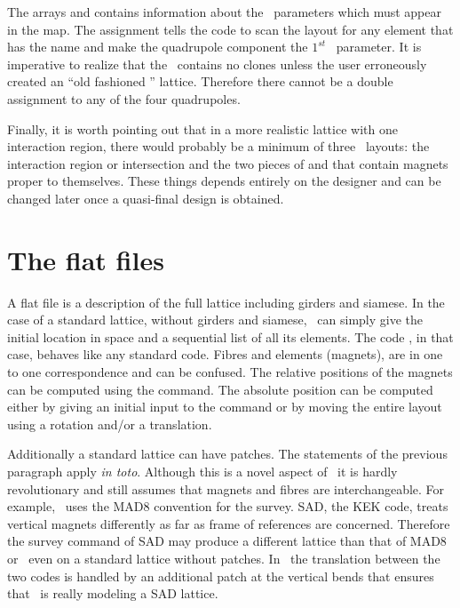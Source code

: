 The arrays  and  contains information about the \TPSA\ parameters which must appear in the map. The assignment  tells the code to scan the layout    for any element that has the name  and make the quadrupole component the $1^{st}$ \TPSA\ parameter. It is imperative to realize that the \DNA\ contains no clones unless the user erroneously created an ``old fashioned '' lattice. Therefore there cannot be a double assignment  to any of the four quadrupoles.

Finally, it is worth pointing out that in a more realistic lattice with one interaction region, there would probably be a minimum of three \DNA\ layouts: the interaction region or intersection and the two pieces of  and  that contain magnets proper to themselves.  These things depends entirely on the designer and can be changed later once a quasi-final design is obtained. 

\section{The flat files}
\label{sec:model.flat}

A flat file is a description of the full lattice including girders and
siamese. In the case of a standard lattice, without girders and
siamese, \PTC\ can simply give the initial location in space and a
sequential list of all its elements.  The code \PTC, in that case,
behaves like any standard code. Fibres and elements (magnets), are in
one to one correspondence and can be confused. The relative positions
of the magnets can be computed using the  command. The
absolute position can be computed either by giving an initial input to
the  command or by moving the entire layout using a
rotation and/or a translation.

Additionally a standard lattice can have patches. The statements of
the previous paragraph apply \emph{in toto}. Although this is a novel
aspect of \PTC\ it is hardly revolutionary and still assumes that
magnets and fibres are interchangeable. For example, \PTC\ uses the
MAD8 convention for the survey. SAD, the KEK code, treats vertical
magnets differently as far as frame of references are
concerned. Therefore the survey command of SAD may produce a different
lattice than that of MAD8 or \PTC\ even on a standard lattice without
patches. In \PTC\ the translation between the two codes is handled by
an additional patch at the vertical bends that ensures that \PTC\ is
really modeling a SAD lattice.


